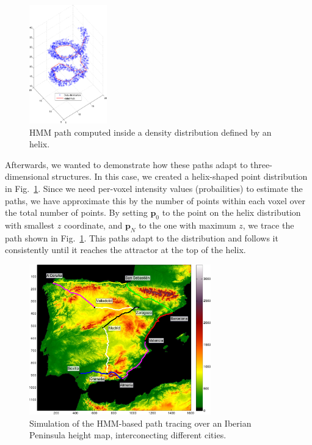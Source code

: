 \begin{figure}
	\begin{center}
		\includegraphics[width=0.3\textwidth]{Graphics/ch6/spire}
		\caption{\ac{HMM} path computed inside a density distribution defined by an helix.}
		\label{fig:spire}
	\end{center}
\end{figure}

Afterwards, we wanted to demonstrate how these paths adapt to three-di\-men\-sio\-nal structures. In this case, we created a helix-shaped point distribution in Fig.~\ref{fig:spire}. Since we need per-voxel intensity values (probailities) to estimate the paths, we have approximate this by the number of points within each voxel over the total number of points. By setting $\mathbf{p}_0$ to the point on the helix distribution with smallest $z$ coordinate, and $\mathbf{p}_N$ to the one with maximum $z$, we trace the path shown in Fig.~\ref{fig:spire}. This paths adapt to the distribution and follows it consistently until it reaches the attractor at the top of the helix.


\begin{figure}[htp]
	\centering
	\includegraphics[width=0.7\textwidth]{Graphics/ch6/spain.pdf}
	\caption{Simulation of the \ac{HMM}-based path tracing over an Iberian Peninsula height map, interconecting different cities.}
	\label{fig:spainmap}
\end{figure}

